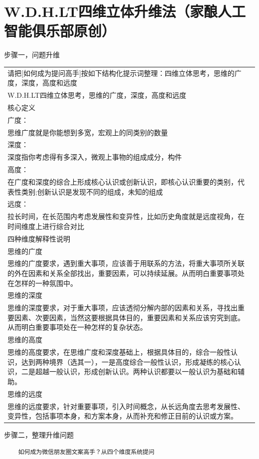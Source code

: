 \documentclass[12pt]{book}
\begin{document}
	\section{W.D.H.LT四维立体升维法（家酿人工智能俱乐部原创）}
	步骤一，问题升维\\
		\begin{tabular}{|p{16cm}|p{3cm}|}
	\hline
请把[如何成为提问高手]按如下结构化提示词整理：四维立体思考，思维的广度，深度，高度和远度\\
W.D.H.LT四维立体思考，思维的广度，深度，高度和远度\\
核心定义\\
广度：\\
思维广度就是你能想到多宽，宏观上的同类别的数量\\
深度：\\
深度指你考虑得有多深入，微观上事物的组成成分，构件\\
高度：\\
在广度和深度的综合上形成核心认识或创新认识，即核心认识重要的类别，代表性类别;创新认识是发现不同的组成，未知的组成\\
远度：\\
拉长时间，在长范围内考虑发展性和变异性，比如历史角度就是远度视角，在时间维度上进行综合对比\\
四种维度解释性说明\\
思维的广度\\
思维的广度要求，遇到重大事项，应该善于用联系的方法，将重大事项所关联的外在因素和关系全部找出，重要因素，可以持续延展。从而明白重要事项处在怎样的一种氛围中。\\
思维的深度\\
思维的深度要求，对于重大事项，应该透彻分解内部的因素和关系，寻找出重要因素、次要因素，当然这要根据具体目的，重要因素和关系应该穷究到底。从而明白重要事项处在一种怎样的复杂状态。\\
思维的高度\\
思维的高度要求，在思维广度和深度基础上，根据具体目的，综合一般性认识，达到两种境界（选其一），一是高度综合一般性认识，形成凝练的核心认识，二是超越一般认识，形成创新认识。两种认识都要以一般认识为基础和辅助。\\
思维的远度\\
思维的远度要求，针对重要事项，引入时间概念，从长远角度去思考发展性、变异性，包括事项本身，和方案本身，从而补充和修正目前的认识或方案。\\
	\hline
\end{tabular}
	
	步骤二，整理升维问题
			\begin{tcolorbox}
	\begin{lstlisting}	
	如何成为微信朋友圈文案高手？从四个维度系统提问
		\end{lstlisting}
\end{tcolorbox}	
\end{document}
